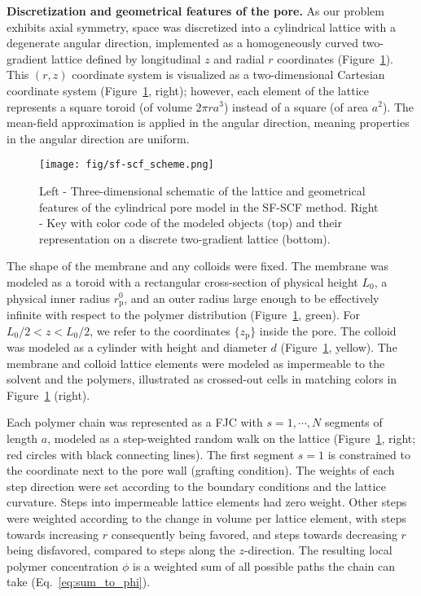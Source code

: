 \documentclass[10pt, a4paper, twocolumn]{article}
\begin{document}
\bigskip\noindent
\textbf{Discretization and geometrical features of the pore.}
As our problem exhibits axial symmetry, space was discretized into a cylindrical lattice with a degenerate angular direction,
implemented as a homogeneously curved two-gradient lattice defined by longitudinal $z$ and radial $r$ coordinates (Figure~\ref{fig:sf-scf_scheme}).
This $(r,z)$ coordinate system is visualized as a two-dimensional Cartesian coordinate system (Figure~\ref{fig:sf-scf_scheme}, right); however, each element of the lattice represents a square toroid (of volume $2 \pi r a^3$) instead of a square (of area $a^2$).
The mean-field approximation is applied in the angular direction, meaning properties in the angular direction are uniform.

\begin{figure}[h]
    \centering
    \texttt{[image: fig/sf-scf\_scheme.png]}
    \caption{
    Left - Three-dimensional schematic of the lattice and geometrical features of the cylindrical pore model in the SF-SCF method.
    Right - Key with color code of the modeled objects (top) and their representation on a discrete two-gradient lattice (bottom).
    }
    \label{fig:sf-scf_scheme}
\end{figure}

The shape of the membrane and any colloids were fixed.
The membrane was modeled as a toroid with a rectangular cross-section of physical height $L_0$, a physical inner radius $r_{\text{p}}^0$, and an outer radius large enough to be effectively infinite with respect to the polymer distribution (Figure~\ref{fig:sf-scf_scheme}, green).
For $L_0/2 < z < L_0/2$, we refer to the coordinates $\{z_\text{p}\}$ inside the pore.
The colloid was modeled as a cylinder with height and diameter $d$ (Figure~\ref{fig:sf-scf_scheme}, yellow).
The membrane and colloid lattice elements were modeled as impermeable to the solvent and the polymers, illustrated as crossed-out cells in matching colors in Figure~\ref{fig:sf-scf_scheme} (right).

Each polymer chain was represented as a FJC with $s=1, \cdots, N$ segments of length $a$, modeled as a step-weighted random walk on the lattice (Figure~\ref{fig:sf-scf_scheme}, right; red circles with black connecting lines).
The first segment $s=1$ is constrained to the coordinate next to the pore wall (grafting condition).
The weights of each step direction were set according to the boundary conditions and the lattice curvature.
Steps into impermeable lattice elements had zero weight.
Other steps were weighted according to the change in volume per lattice element, with steps towards increasing $r$ consequently being favored, and steps towards decreasing $r$ being disfavored, compared to steps along the $z$-direction.
The resulting local polymer concentration $\phi$ is a weighted sum of all possible paths the chain can take (Eq.~\eqref{eq:sum_to_phi}).
\end{document}
